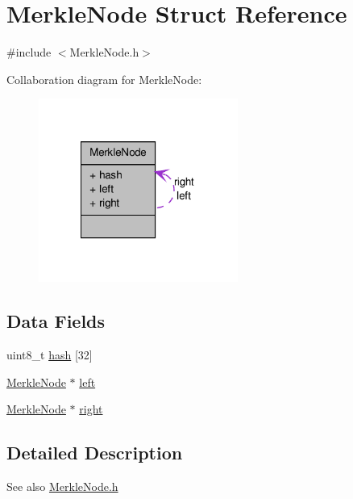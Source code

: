 \hypertarget{struct_merkle_node}{
\section{MerkleNode Struct Reference}
\label{struct_merkle_node}
}


{\ttfamily \#include $<$MerkleNode.h$>$}



Collaboration diagram for MerkleNode:\nopagebreak
\begin{figure}[H]
\begin{center}
\leavevmode
\includegraphics[width=185pt]{struct_merkle_node__coll__graph}
\end{center}
\end{figure}
\subsection*{Data Fields}
\begin{DoxyCompactItemize}
\item 
uint8\_\-t \hyperlink{struct_merkle_node_a7ff9da008bf055da1f1ba994c562057d}{hash} \mbox{[}32\mbox{]}
\item 
\hyperlink{struct_merkle_node}{MerkleNode} $\ast$ \hyperlink{struct_merkle_node_a3292e1ae6fbbb8666d2007bee45b69a1}{left}
\item 
\hyperlink{struct_merkle_node}{MerkleNode} $\ast$ \hyperlink{struct_merkle_node_a131f273991e1615aab021dd945479c62}{right}
\end{DoxyCompactItemize}


\subsection{Detailed Description}
\begin{DoxySeeAlso}{See also}
\hyperlink{_merkle_node_8h}{MerkleNode.h} 
\end{DoxySeeAlso}


